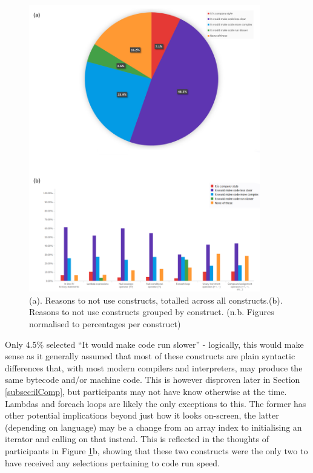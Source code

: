 \documentclass{article}
\begin{document}
            \begin{figure}[htbp]
                \centering
                \includegraphics[width=0.9\textwidth]{toNotUse}
                \caption{(a). Reasons to not use constructs, totalled across all constructs.\newline (b). Reasons to not use constructs grouped by construct. (n.b. Figures normalised to percentages per construct)}
                \label{fig:toNotUse}
            \end{figure}

            Only 4.5\% selected ``It would make code run slower'' - logically, this would make sense as it generally assumed that most of these constructs are plain syntactic differences that, with most modern compilers and interpreters, may produce the same bytecode and/or machine code. This is however disproven later in Section \ref{subsec:ilComp}, but participants may not have know otherwise at the time. Lambdas and foreach loops are likely the only exceptions to this. The former has other potential implications beyond just how it looks on-screen, the latter (depending on language) may be a change from an array index to initialising an iterator and calling on that instead. This is reflected in the thoughts of participants in Figure \ref{fig:toNotUse}b, showing that these two constructs were the only two to have received any selections pertaining to code run speed.
\end{document}
